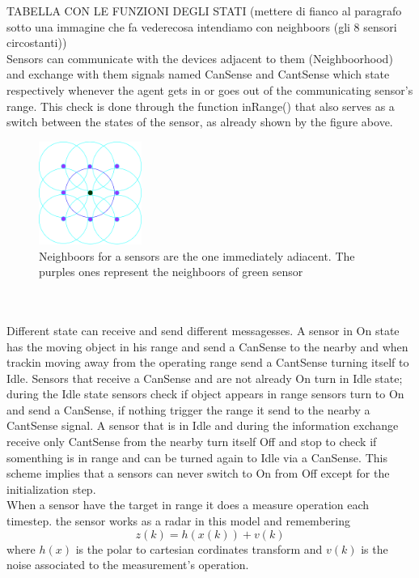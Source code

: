 \documentclass[twocolumn]{article}
\begin{document}
    TABELLA CON LE FUNZIONI DEGLI STATI (mettere di fianco al paragrafo sotto una immagine che fa  vederecosa intendiamo con neighboors (gli 8 
    sensori circostanti))
    \\
    Sensors can communicate with the devices adjacent to them (Neighboorhood) and exchange with them signals named CanSense and CantSense
    which state respectively whenever the agent gets in or goes out of the communicating sensor's range. This check is done through the 
    function inRange() that also serves as a switch between the states of the sensor, as already shown by the figure above.
    \begin{figure}[h!]
        \centering
        \includegraphics[width=0.3\textwidth]{Immagini/Neighboors.png}
        \caption{Neighboors for a sensors are the one immediately adiacent. The purples ones represent the neighboors of green sensor}
        \label{fig:galaxy}
    \end{figure}
    \\
    \\
    Different state can receive and send different messagesses. A sensor in On state has the moving
    object in his range and send a CanSense to the nearby and when trackin moving away from the operating range send a CantSense turning itself to Idle.
    Sensors that receive a CanSense and are not already On turn in Idle state; during the Idle state sensors check
    if object appears in range sensors turn to On and send a CanSense, if nothing trigger the range it send to the nearby a CantSense signal.
    A sensor that is in Idle and during the information exchange receive only CantSense from the nearby turn itself Off and stop to check if somenthing is in range and
    can be turned again to Idle via a CanSense. This scheme implies that a sensors can never switch to On from Off except for the initialization step.
    \\
    When a sensor have the target in range it does a measure operation each timestep. the sensor works as a radar in this model and remembering
    \begin{equation}
        z(k)=h(x(k))+v(k)
    \end{equation}
    where $h(x)$ is the polar to cartesian cordinates transform and $v(k)$ is the noise associated to the measurement's operation.
\end{document}
